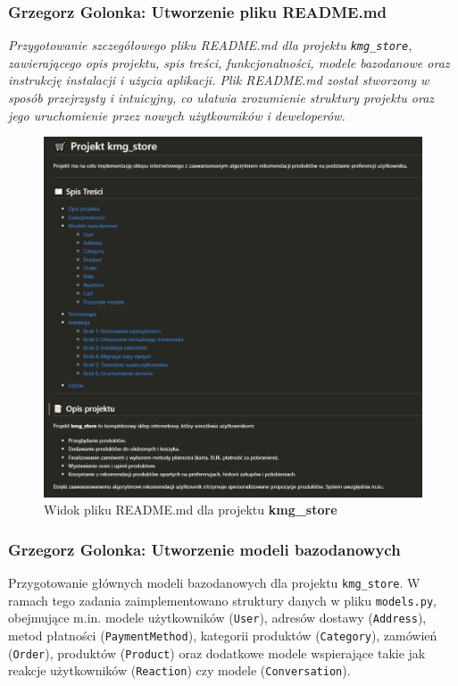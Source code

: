 \documentclass[12pt,a4paper,oneside]{article}
\theoremstyle{definition}
\numberwithin{equation}{section}
\begin{document}
\subsubsection{Grzegorz Golonka: Utworzenie pliku README.md }
\label{section:1.3.17}
\textit{Przygotowanie szczegółowego pliku README.md dla projektu \texttt{kmg\_store},
 zawierającego opis projektu, spis treści, funkcjonalności, 
 modele bazodanowe oraz instrukcję instalacji i użycia aplikacji. 
Plik README.md został stworzony w sposób przejrzysty i intuicyjny, 
co ułatwia zrozumienie struktury projektu oraz jego uruchomienie przez nowych użytkowników i deweloperów.}
\begin{figure}[H]
    \centering
    \includegraphics[width=0.9\columnwidth]{images/krzysztofBImages/readme_preview.png}
    \caption{Widok pliku README.md dla projektu \textbf{kmg\_store}}
\end{figure}
% 
% 
\subsubsection{Grzegorz Golonka: Utworzenie modeli bazodanowych}
\label{section:1.3.18}
Przygotowanie głównych modeli bazodanowych dla projektu \texttt{kmg\_store}. 
W ramach tego zadania zaimplementowano struktury danych w pliku \texttt{models.py}, 
obejmujące m.in. modele użytkowników (\texttt{User}), adresów dostawy (\texttt{Address}), 
metod płatności (\texttt{PaymentMethod}), kategorii produktów (\texttt{Category}), 
zamówień (\texttt{Order}), produktów (\texttt{Product}) oraz dodatkowe modele wspierające 
takie jak reakcje użytkowników (\texttt{Reaction}) czy modele (\texttt{Conversation}). 
\end{document}
